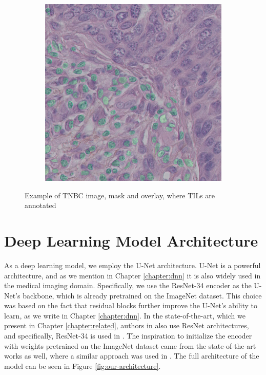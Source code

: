 \begin{figure}[H]
\begin{subfigure}[b]{0.32\textwidth}
    \label{fig:tcga-mask}
  \end{subfigure}%
  \hfill
  \begin{subfigure}[b]{0.32\textwidth}
    \centering
    \includegraphics[width=\linewidth]{assets/images/for_presentation/overlay_10_1.png}
    \label{fig:tcga-overlay}
  \end{subfigure}%
  \caption{Example of TNBC image, mask and overlay, where TILs are annotated \cite{TNBC-nuclei-seg-extended}}
  \label{fig:tcga-with-without}
\end{figure}

\section{Deep Learning Model Architecture}
As a deep learning model, we employ the U-Net architecture. U-Net is a powerful architecture, and as we mention in Chapter \ref{chapter:dnn} it is also widely used in the medical imaging domain. Specifically, we use the ResNet-34 encoder as the U-Net's backbone, which is already pretrained on the ImageNet dataset. This choice was based on the fact that residual blocks further improve the U-Net's ability to learn, as we write in Chapter \ref{chapter:dnn}. In the state-of-the-art, which we present in Chapter \ref{chapter:related}, authors in \cite{Zhang2022, Liang2023} also use ResNet architectures, and specifically, ResNet-34 is used in \cite{Lin2023}. The inspiration to initialize the encoder with weights pretrained on the ImageNet dataset came from the state-of-the-art works as well, where a similar approach was used in \cite{Zhang2022, Lin2023, Liang2023}. The full architecture of the model can be seen in Figure \ref{fig:our-architecture}.

